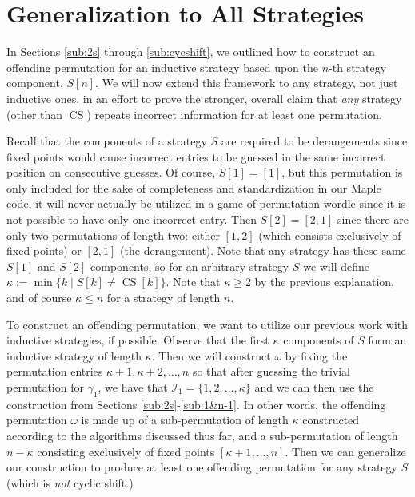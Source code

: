 \documentclass[article]{amsart}
\theoremstyle{plain}
\DeclareMathOperator{\CS}{CS}
\begin{document}
\section{Generalization to All Strategies} \label{sec:allstrats}

In Sections \ref{sub:2s} through \ref{sub:cycshift}, we outlined how to construct an offending permutation for an inductive strategy based upon the $n$-th strategy component, $S[n]$. We will now extend this framework to any strategy, not just inductive ones, in an effort to prove the stronger, overall claim that \textit{any} strategy (other than $\CS$) repeats incorrect information for at least one permutation.

Recall that the components of a strategy $S$ are required to be derangements since fixed points would cause incorrect entries to be guessed in the same incorrect position on consecutive guesses. Of course, $S[1] = [1]$, but this permutation is only included for the sake of completeness and standardization in our Maple code, it will never actually be utilized in a game of permutation wordle since it is not possible to have only one incorrect entry. Then $S[2] = [2,1]$ since there are only two permutations of length two: either $[1,2]$ (which consists exclusively of fixed points) or $[2,1]$ (the derangement). Note that any strategy has these same $S[1]$ and $S[2]$ components, so for an arbitrary strategy $S$ we will define $\kappa := \min \{ k \mid S[k] \neq \CS[k] \}$. Note that $\kappa \geq 2$ by the previous explanation, and of course $\kappa \leq n$ for a strategy of length $n$.

To construct an offending permutation, we want to utilize our previous work with inductive strategies, if possible. Observe that the first $\kappa$ components of $S$ form an inductive strategy of length $\kappa$. Then we will construct $\omega$ by fixing the permutation entries $\kappa+1, \kappa+2, \dots, n$ so that after guessing the trivial permutation for $\gamma_1$, we have that $\mathcal{I}_1 = \{ 1,2,\dots, \kappa \}$ and we can then use the construction from Sections \ref{sub:2s}-\ref{sub:1&n-1}. In other words, the offending permutation $\omega$ is made up of a sub-permutation of length $\kappa$ constructed according to the algorithms discussed thus far, and a sub-permutation of length $n - \kappa$ consisting exclusively of fixed points $[\kappa+1, \dots, n]$. Then we can generalize our construction to produce at least one offending permutation for any strategy $S$ (which is \textit{not} cyclic shift.)
\end{document}
